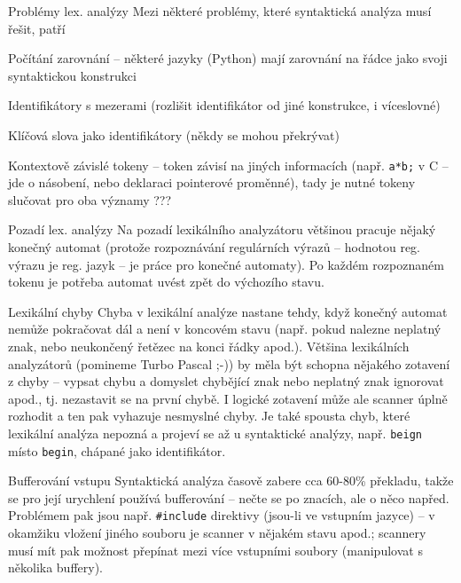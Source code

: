 \begin{obecne}{Problémy lex. analýzy}
Mezi některé problémy, které syntaktická analýza musí řešit, patří
\begin{pitemize}
    \item Počítání zarovnání -- některé jazyky (Python) mají zarovnání na řádce jako svoji syntaktickou konstrukci
    \item Identifikátory s mezerami (rozlišit identifikátor od jiné konstrukce, i víceslovné)
    \item Klíčová slova jako identifikátory (někdy se mohou překrývat)
    \item Kontextově závislé tokeny -- token závisí na jiných informacích (např. \texttt{a*b;} v C -- jde o násobení, nebo deklaraci pointerové proměnné), tady je nutné tokeny slučovat pro oba významy ???
\end{pitemize}
\end{obecne}

\begin{obecne}{Pozadí lex. analýzy}
Na pozadí lexikálního analyzátoru většinou pracuje nějaký konečný automat (protože rozpoznávání regulárních výrazů -- hodnotou reg. výrazu je reg. jazyk -- je práce pro konečné automaty). Po každém rozpoznaném tokenu je potřeba automat uvést zpět do výchozího stavu.
\end{obecne}

\begin{obecne}{Lexikální chyby}
Chyba v lexikální analýze nastane tehdy, když konečný automat nemůže pokračovat dál a není v koncovém stavu (např. pokud nalezne neplatný znak, nebo neukončený řetězec na konci řádky apod.). Většina lexikálních analyzátorů (pomineme Turbo Pascal ;-)) by měla být schopna nějakého  zotavení z chyby -- vypsat chybu a domyslet chybějící znak nebo neplatný znak ignorovat apod., tj. nezastavit se na první chybě. I logické zotavení může ale scanner úplně rozhodit a ten pak vyhazuje nesmyslné chyby. Je také spousta chyb, které lexikální analýza nepozná a projeví se až u syntaktické analýzy, např. \texttt{beign} místo \texttt{begin}, chápané jako identifikátor. 
\end{obecne}

\begin{poznamkaN}{Bufferování vstupu}
Syntaktická analýza časově zabere cca 60-80\% překladu, takže se pro její urychlení používá bufferování -- nečte se po znacích, ale o něco napřed. Problémem pak jsou např. \texttt{\#include} direktivy (jsou-li ve vstupním jazyce) -- v okamžiku vložení jiného souboru je scanner v nějakém stavu apod.; scannery musí mít pak možnost přepínat mezi více vstupními soubory (manipulovat s několika buffery).
\end{poznamkaN}

